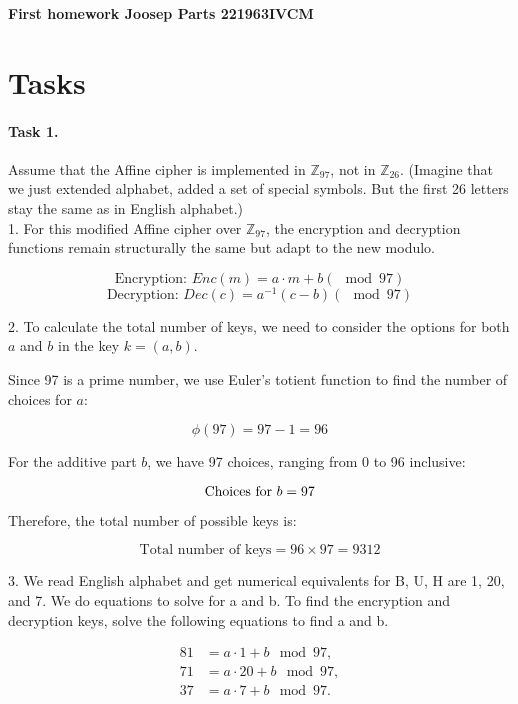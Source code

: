 \documentclass{article}
\begin{document}
\begin{tcolorbox}[colframe=ttblue, colback=ttblue!10]
\begin{center}
\begin{large}
\textbf{First homework Joosep Parts 221963IVCM}
\end{large}
\end{center}
\end{tcolorbox}

\section*{Tasks}

\paragraph{Task 1.} Assume that the Affine cipher is implemented in $\mathbb{Z}_{97}$, not in $\mathbb{Z}_{26}$. (Imagine that we just
extended alphabet, added a set of special symbols. But the first 26 letters stay the same as in English alphabet.)\\

1. For this modified Affine cipher over \( \mathbb{Z}_{97} \), the encryption and decryption functions remain structurally the same but
adapt to the new modulo.

$$\text{Encryption: } Enc(m) = a\cdot m + b (\mod 97)$$
$$\text{Decryption: } Dec(c) = a^{-1}(c - b) (\mod 97)$$


2. To calculate the total number of keys, we need to consider the options for both \( a \) and \( b \) in the key \( k = (a, b) \).

Since 97 is a prime number, we use Euler's totient function to find the number of choices for \( a \):

\[
  \phi(97) = 97 - 1 = 96
\]

For the additive part \( b \), we have 97 choices, ranging from 0 to 96 inclusive:

\[
  \text{Choices for \( b \)} = 97
\]

Therefore, the total number of possible keys is:

\[
  \text{Total number of keys} = 96 \times 97 = 9312
\]


3. We read English alphabet and get numerical equivalents for B, U, H are 1, 20, and 7.
We do equations to solve for a and b.
To find the encryption and decryption keys, solve the following equations to find a and b.

\[
  \begin{aligned}
    81 &= a \cdot 1 + b \mod 97, \\
    71 &= a \cdot 20 + b \mod 97, \\
    37 &= a \cdot 7 + b \mod 97.
  \end{aligned}
\]
\end{document}
